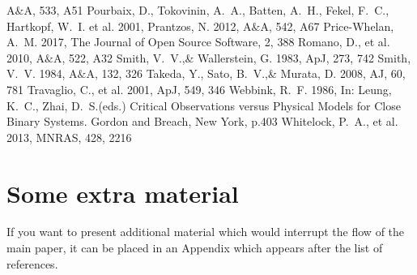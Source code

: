 \documentclass[a4paper,fleqn,usenatbib]{mnras}
\begin{document}
\begin{thebibliography}{99}
A$\&$A, 533, A51
Pourbaix, D., Tokovinin, A.~A., Batten, A.~H., Fekel, F.~C., Hartkopf, W.~I. et al. 2001, 
Prantzos, N. 2012, 
A$\&$A, 542, A67
Price-Whelan, A.~M. 2017, 
The Journal of Open Source Software, 2, 388
Romano, D., et al. 2010, 
A$\&$A, 522, A32
Smith, V.~V.,\& Wallerstein, G. 1983, 
ApJ, 273, 742
Smith, V.~V. 1984, 
A$\&$A, 132, 326
Takeda, Y., Sato, B.~V.,\& Murata, D. 2008, 
AJ, 60, 781
Travaglio, C., et al. 2001, 
ApJ, 549, 346
Webbink, R.~F. 1986, 
In: Leung, K.~C., Zhai, D.~S.(eds.) Critical Observations versus Physical Models for Close Binary Systems. Gordon and Breach, New York, p.403
Whitelock, P.~A., et al. 2013, 
MNRAS, 428, 2216

\end{thebibliography}


\appendix

\section{Some extra material}

If you want to present additional material which would interrupt the flow of the main paper,
it can be placed in an Appendix which appears after the list of references.

\bsp	%
\label{lastpage}
\end{document}
